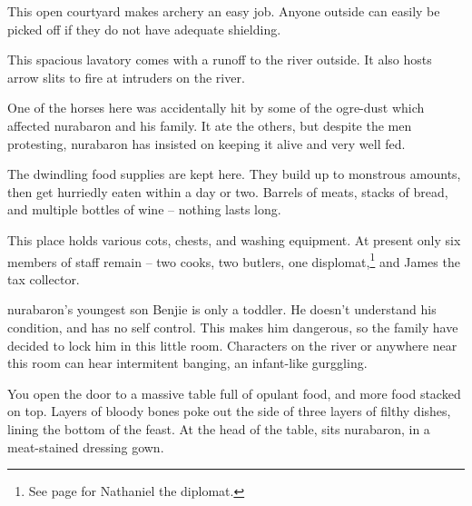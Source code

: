 
This open courtyard makes archery an easy job.  Anyone outside can easily be picked off if they do not have adequate shielding.


This spacious lavatory comes with a runoff to the river outside.  It also hosts arrow slits to fire at intruders on the river.


One of the horses here was accidentally hit by some of the ogre-dust which affected \gls{nurabaron} and his family.  It ate the others, but despite the men protesting, \gls{nurabaron} has insisted on keeping it alive and very well fed.


\nurahorse


The dwindling food supplies are kept here.  They build up to monstrous amounts, then get hurriedly eaten within a day or two.  Barrels of meats, stacks of bread, and multiple bottles of wine -- nothing lasts long.


This place holds various cots, chests, and washing equipment.  At present only six members of staff remain -- two cooks, two butlers, one displomat,\footnote{See page \pageref{nathaniel} for Nathaniel the diplomat.} and James the tax collector.


\Gls{nurabaron}'s youngest son Benjie is only a toddler.  He doesn't understand his condition, and has no self control.  This makes him dangerous, so the family have decided to lock him in this little room.  Characters on the river or anywhere near this room can hear intermitent banging, an infant-like gurggling.


\deephobgoblin


\begin{boxtext}

	You open the door to a massive table full of opulant food, and more food stacked on top.  Layers of bloody bones poke out the side of three layers of filthy dishes, lining the bottom of the feast.  At the head of the table, sits \gls{nurabaron}, in a meat-stained dressing gown.

\end{boxtext}

